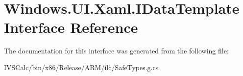 \hypertarget{interface_windows_1_1_u_i_1_1_xaml_1_1_i_data_template}{}\section{Windows.\+U\+I.\+Xaml.\+I\+Data\+Template Interface Reference}
\label{interface_windows_1_1_u_i_1_1_xaml_1_1_i_data_template}


The documentation for this interface was generated from the following file\+:\begin{DoxyCompactItemize}
\item 
I\+V\+S\+Calc/bin/x86/\+Release/\+A\+R\+M/ilc/Safe\+Types.\+g.\+cs\end{DoxyCompactItemize}
